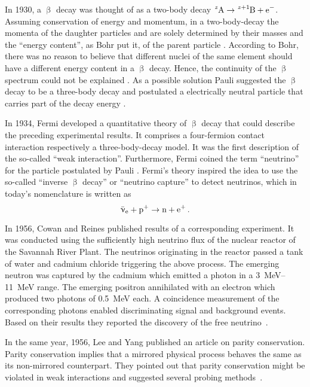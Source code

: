 In 1930, a $\upbeta$ decay was thought of as a two-body decay $\ce{^zA} \rightarrow \ce{^{z+1}B} + \ce{e^-}$. Assuming conservation of energy and momentum, in a two-body-decay the momenta of the daughter particles  and  are solely determined by their masses and the ``energy content'', as Bohr put it, of the parent particle . According to Bohr, there was no reason to believe that different nuclei of the same element  should have a different energy content in a $\upbeta$ decay. Hence, the continuity of the $\upbeta$ spectrum could not be explained \cite{Bohr:1}. As a possible solution Pauli suggested the $\upbeta$ decay to be a three-body decay and postulated a electrically neutral particle that carries part of the decay energy \cite{Pauli1930}. 

In 1934, Fermi developed a quantitative theory of $\upbeta$ decay that could describe the preceding experimental results. It comprises a four-fermion contact interaction respectively a three-body-decay model. It was the first description of the so-called ``weak interaction''. Furthermore, Fermi coined the term ``neutrino'' for the particle postulated by Pauli \cite{Fermi1934}. Fermi's theory inspired the idea to use the so-called ``inverse $\upbeta$ decay'' or ``neutrino capture'' to detect neutrinos, which in today's nomenclature is written as
\begin{equation*}
    \aeneutrino + \ce{p^+} \rightarrow \ce{n} + \ce{e^+} \fullstop
\end{equation*}

In 1956, Cowan and Reines published results of a corresponding experiment. It was conducted using the sufficiently high neutrino flux of the nuclear reactor of the Savannah River Plant. The neutrinos originating in the reactor passed a tank of water and cadmium chloride triggering the above process. The emerging neutron was captured by the cadmium which emitted a photon in a \SIrange{3}{11}{MeV} range. The emerging positron annihilated with an electron which produced two photons of \SI{0.5}{MeV} each. A coincidence measurement of the corresponding photons enabled discriminating signal and background events. Based on their results they reported the discovery of the free neutrino~\cite{Cowan103}. 

In the same year, 1956, Lee and Yang published an article on parity conservation. Parity conservation implies that a mirrored physical process behaves the same as its non-mirrored counterpart. They pointed out that parity conservation might be violated in weak interactions and suggested several probing methods~\cite{Lee1956}. 

